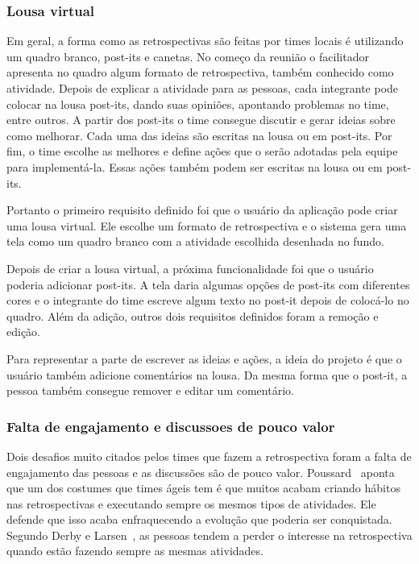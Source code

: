 \subsubsection*{Lousa virtual}

Em geral, a forma como as retrospectivas são feitas por times locais é utilizando um quadro branco, post-its e canetas. No começo da reunião o facilitador apresenta no quadro algum formato de retrospectiva, também conhecido como atividade. Depois de explicar a atividade para as pessoas, cada integrante pode colocar na lousa post-its, dando suas opiniões, apontando problemas no time, entre outros. A partir dos post-its o time consegue discutir e gerar ideias sobre como melhorar. Cada uma das ideias são escritas na lousa ou em post-its. Por fim, o time escolhe as melhores e define ações que o serão adotadas pela equipe para implementá-la. Essas ações também podem ser escritas na lousa ou em post-its.

Portanto o primeiro requisito definido foi que o usuário da aplicação pode criar uma lousa virtual. Ele escolhe um formato de retrospectiva e o sistema gera uma tela como um quadro branco com a atividade escolhida desenhada no fundo.

Depois de criar a lousa virtual, a próxima funcionalidade foi que o usuário poderia adicionar post-its. A tela daria algumas opções de post-its com diferentes cores e o integrante do time escreve algum texto no post-it depois de colocá-lo no quadro. Além da adição, outros dois requisitos definidos foram a remoção e edição.

Para representar a parte de escrever as ideias e ações, a ideia do projeto é que o usuário também adicione comentários na lousa. Da mesma forma que o post-it, a pessoa também consegue remover e editar um comentário.

\subsubsection*{Falta de engajamento e discussoes de pouco valor}

Dois desafios muito citados pelos times que fazem a retrospectiva foram a falta de engajamento das pessoas e as discussões são de pouco valor. Poussard~\cite{poussard} aponta que um dos costumes que times ágeis tem é que muitos acabam criando hábitos nas retrospectivas e executando sempre os mesmos tipos de atividades. Ele defende que isso acaba enfraquecendo a evolução que poderia ser conquistada. Segundo Derby e Larsen~\cite{retrospectives},  as pessoas tendem a perder o interesse na retrospectiva quando estão fazendo sempre as mesmas atividades.

